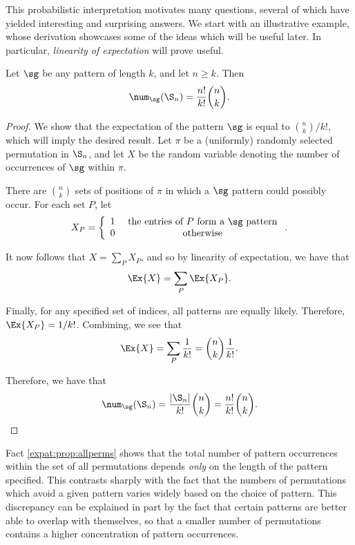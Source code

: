 \documentclass[12pt,twoside]{memoir}
\begin{document}
      This probabilistic interpretation motivates many questions, several of which
      have yielded interesting and surprising answers. We start with an
      illustrative example, whose derivation showcases some of the ideas which
      will be useful later. In particular, \emph{linearity of expectation}
       will prove useful. 
      
      \begin{proposition} \label{expat:prop:allperms}
        Let $\sg$ be any pattern of length $k$, and let $n \geq k$.  Then 
        $$ \num_\sg(\S_n) = \frac{n!}{k!} \binom{n}{k}.$$
      \end{proposition}
      \begin{proof}
        We show that the expectation of the pattern $\sg$ is equal to 
        $\binom{n}{k}/k!$, which will imply the desired result. 
        Let $\pi$ be a (uniformly) randomly selected permutation in $\S_n$, and let
        $X$ be the random variable denoting the number of occurrences of $\sg$
        within $\pi$. 

        There are $\binom{n}{k}$ sets of positions of $\pi$ in which a $\sg$
        pattern could possibly occur. For each set $P$, let 
        $$ X_P = \left\{ \begin{array}{cc} 
                  1 & \text{ the entries of $P$ form a $\sg$ pattern} \\
                  0 & \text{ otherwise} 
                \end{array}\right..
        $$

        It now follows that $X = \sum_{P} X_P$, and so by linearity of expectation,
        we have that 
        $$ \Ex{X} = \sum_P \Ex{X_P}.$$

        Finally, for any specified set of indices, all patterns are equally likely.
        Therefore, $\Ex{X_P} = 1 / k!$. Combining, we see that 
        $$ \Ex{X} = \sum_P \frac{1}{k!} = \binom{n}{k}\frac{1}{k!}. $$

        Therefore, we have that 
        $$\num_\sg(\S_n) = \frac{|\S_n|}{k!} \binom{n}{k} =
        \frac{n!}{k!} \binom{n}{k}.$$
      \end{proof}


      Fact \ref{expat:prop:allperms} shows that the total number of pattern occurrences
      within the set of all permutations depends \emph{only} on the length of the
      pattern specified. This contrasts sharply with the fact that the numbers of
      permutations which avoid a given pattern varies widely based on the choice of
      pattern. This discrepancy can be explained in part by the fact that certain
      patterns are better able to overlap with themselves, so that a smaller number
      of permutations contains a higher concentration of pattern occurrences. 
      
\end{document}

